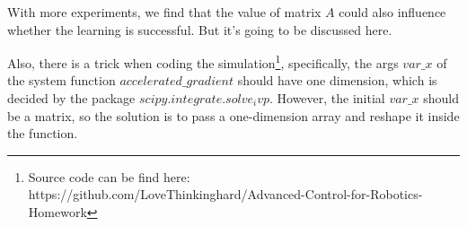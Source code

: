 \documentclass{article}
\begin{document}
With more experiments, we find that the value of matrix $A$ could also influence
whether the learning is successful. But it's going to be discussed here.

Also, there is a trick when coding the simulation\footnote{Source
code can be find here: 
https://github.com/LoveThinkinghard/Advanced-Control-for-Robotics-Homework},
specifically,
the args $var\_x$ of the system function $accelerated\_gradient$
should have one dimension, which is decided by the package $scipy.integrate.solve_ivp$.
However, the initial $var\_x$ should be a matrix, so the solution is to pass a
one-dimension array and reshape it inside the function.
\end{document}
